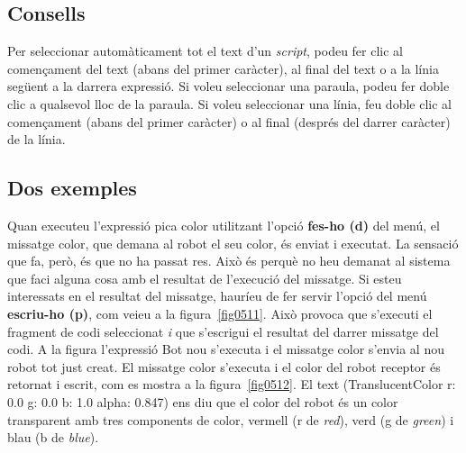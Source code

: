 \subsection{Consells}

Per seleccionar automàticament tot el text d'un \emph{script}, podeu fer clic al començament del text (abans del primer caràcter), al final del text o a la línia següent a la darrera expressió. Si voleu seleccionar una paraula, podeu fer doble clic a qualsevol lloc de la paraula. Si voleu seleccionar una línia, feu doble clic al començament (abans del primer caràcter) o al final (després del darrer caràcter) de la línia.

\subsection{Dos exemples}
Quan executeu l'expressió \textsf{pica color} utilitzant l'opció \textbf{fes-ho (d)} del menú, el missatge \textsf{color}, que demana al robot el seu color, és enviat i executat. La sensació que fa, però, és que no ha passat res. Això és perquè no heu demanat al sistema que faci alguna cosa amb el resultat de l'execució del missatge. Si esteu interessats en el resultat del missatge, hauríeu de fer servir l'opció del menú \textbf{escriu-ho (p)}, com veieu a la figura~\ref{fig0511}. Això provoca que s'executi el fragment de codi seleccionat \emph{i} que s'escrigui el resultat del darrer missatge del codi. A la figura l'expressió \textsf{Bot nou} s'executa i el missatge \textsf{color} s'envia al nou robot tot just creat. El missatge \textsf{color} s'executa i el color del robot receptor és retornat i escrit, com es mostra a la figura~\ref{fig0512}. El text (\textsf{TranslucentColor r: 0.0 g: 0.0 b: 1.0 alpha: 0.847}) ens diu que el color del robot és un color transparent amb tres components de color, vermell (\textsf{r} de \emph{red}), verd (\textsf{g} de \emph{green}) i blau (\textsf{b} de \emph{blue}).    

